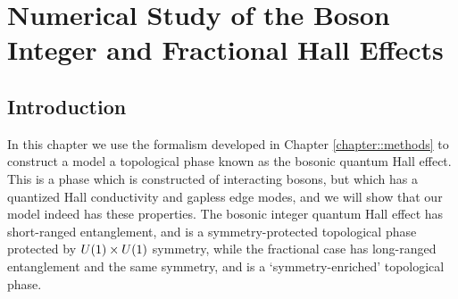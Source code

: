 
\chapter{Numerical Study of the Boson Integer and Fractional Hall Effects}
\label{chapter::FQHE}

\section{Introduction}

In this chapter we use the formalism developed in Chapter \ref{chapter::methods} to construct a model a topological phase known as the bosonic quantum Hall effect. This is a phase which is constructed of interacting bosons, but which has a quantized Hall conductivity and gapless edge modes, and we will show that our model indeed has these properties. The bosonic integer quantum Hall effect has short-ranged entanglement, and is a symmetry-protected topological phase protected by $U(1)\times U(1)$ symmetry, while the fractional case has long-ranged entanglement and the same symmetry, and is a `symmetry-enriched' topological phase\cite{EssinHermele}. 

